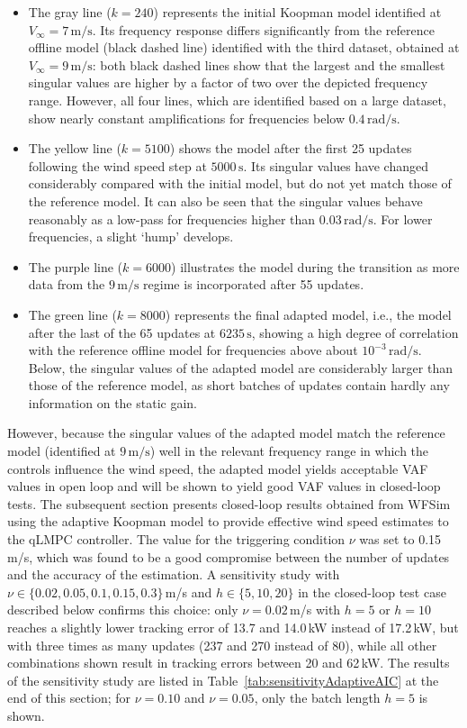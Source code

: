 %
\begin{itemize}
    \item The gray line ($k = 240$) represents the initial Koopman model identified at $V_{\infty} = 7\,\mathrm{m/s}$. Its frequency response differs significantly from the reference offline model (black dashed line) identified with the third dataset, obtained at $V_{\infty} = 9\,\mathrm{m/s}$: both black dashed lines show that the largest and the smallest singular values are higher by a factor of two over the depicted frequency range. However, all four lines, which are identified based on a large dataset, show nearly constant amplifications for frequencies below $0.4\,\mathrm{rad/s}$.
    \item The yellow line ($k = 5100$) shows the model after the first 25 updates following the wind speed step at $5000\,\mathrm{s}$. Its singular values have changed considerably compared with the initial model, but do not yet match those of the reference model. It can also be seen that the singular values behave reasonably as a low-pass for frequencies higher than $0.03\,\mathrm{rad/s}$. For lower frequencies, a slight `hump' develops.
    \item The purple line ($k = 6000$) illustrates the model during the transition as more data from the $9\,\mathrm{m/s}$ regime is incorporated after 55 updates.
    \item The green line ($k = 8000$) represents the final adapted model, i.e., the model after the last of the 65 updates at $6235\,\mathrm{s}$, showing a high degree of correlation with the reference offline model for frequencies above about $10^{-3}\,\mathrm{rad/s}$. Below, the singular values of the adapted model are considerably larger than those of the reference model, as short batches of updates contain hardly any information on the static gain.
\end{itemize}
%
However, because the singular values of the adapted model match the reference model (identified at $9\,\mathrm{m/s}$) well in the relevant frequency range in which the controls influence the wind speed, the adapted model yields acceptable VAF values in open loop and will be shown to yield good VAF values in closed-loop tests.
The subsequent section presents closed-loop results obtained from WFSim using the adaptive Koopman model to provide effective wind speed estimates to the qLMPC controller. The value for the triggering condition $\nu$ was set to 0.15\,m/s, which was found to be a good compromise between the number of updates and the accuracy of the estimation. A sensitivity study with $\nu \in \{0.02, 0.05, 0.1, 0.15, 0.3\}$\,m/s and $h \in \{5, 10, 20\}$ in the closed-loop test case described below confirms this choice: only $\nu = 0.02$\,m/s with $h = 5$ or $h = 10$ reaches a slightly lower tracking error of 13.7 and 14.0\,kW instead of 17.2\,kW, but with three times as many updates (237 and 270 instead of 80), while all other combinations shown result in tracking errors between 20 and 62\,kW. The results of the sensitivity study are listed in Table~\ref{tab:sensitivityAdaptiveAIC} at the end of this section; for $\nu = 0.10$ and $\nu = 0.05$, only the batch length $h = 5$ is shown.



